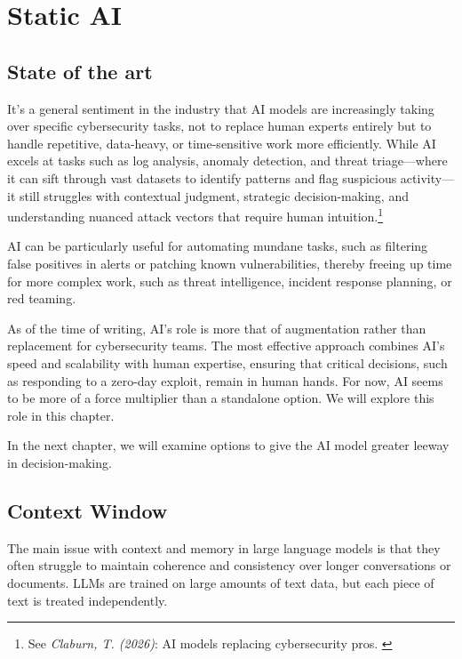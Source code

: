 %
%

\pagebreak
\section{Static AI}

\onehalfspacing

\subsection{State of the art}

It's a general sentiment in the industry that AI models are increasingly taking over specific cybersecurity tasks, not to replace human experts entirely but to handle repetitive, data-heavy, or time-sensitive work more efficiently. While AI excels at tasks such as log analysis, anomaly detection, and threat triage—where it can sift through vast datasets to identify patterns and flag suspicious activity—it still struggles with contextual judgment, strategic decision-making, and understanding nuanced attack vectors that require human intuition.\footnote{See \textit{Claburn, T. (2026)}: AI models replacing cybersecurity pros. \cite{aiSecurity}}

AI can be particularly useful for automating mundane tasks, such as filtering false positives in alerts or patching known vulnerabilities, thereby freeing up time for more complex work, such as threat intelligence, incident response planning, or red teaming.

As of the time of writing, AI's role is more that of augmentation rather than replacement for cybersecurity teams. The most effective approach combines AI's speed and scalability with human expertise, ensuring that critical decisions, such as responding to a zero-day exploit, remain in human hands. For now, AI seems to be more of a force multiplier than a standalone option. We will explore this role in this chapter.

In the next chapter, we will examine options to give the AI model greater leeway in decision-making.

\subsection{Context Window}

The main issue with context and memory in large language models is that they often struggle to maintain coherence and consistency over longer conversations or documents. LLMs are trained on large amounts of text data, but each piece of text is treated independently.

